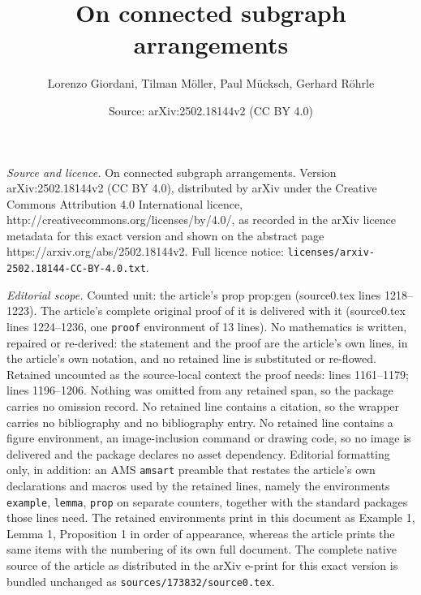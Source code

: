 \documentclass[10pt,a4paper]{amsart}
\title{On connected subgraph arrangements}
\author{Lorenzo Giordani, Tilman M\"oller, Paul M\"ucksch, Gerhard R\"ohrle}
\date{Source: arXiv:2502.18144v2 (CC BY 4.0)}
\begin{document}
\maketitle

\noindent\emph{Source and licence.} On connected subgraph arrangements. Version arXiv:2502.18144v2 (CC BY 4.0), distributed by arXiv under the Creative Commons Attribution 4.0 International licence, http://creativecommons.org/licenses/by/4.0/, as recorded in the arXiv licence metadata for this exact version and shown on the abstract page https://arxiv.org/abs/2502.18144v2. Full licence notice: \texttt{licenses/arxiv-2502.18144-CC-BY-4.0.txt}.\par\smallskip

\noindent\textit{Editorial scope.} Counted unit: the article's prop prop:gen (source0.tex lines 1218--1223). The article's complete original proof of it is delivered with it (source0.tex lines 1224--1236, one \texttt{proof} environment of 13 lines). No mathematics is written, repaired or re-derived: the statement and the proof are the article's own lines, in the article's own notation, and no retained line is substituted or re-flowed.  Retained uncounted as the source-local context the proof needs: lines 1161--1179; lines 1196--1206.  Nothing was omitted from any retained span, so the package carries no omission record.  No retained line contains a citation, so the wrapper carries no bibliography and no bibliography entry.  No retained line contains a figure environment, an image-inclusion command or drawing code, so no image is delivered and the package declares no asset dependency.  Editorial formatting only, in addition: an AMS \texttt{amsart} preamble that restates the article's own declarations and macros used by the retained lines, namely the environments \texttt{example}, \texttt{lemma}, \texttt{prop} on separate counters, together with the standard packages those lines need.  The retained environments print in this document as Example 1, Lemma 1, Proposition 1 in order of appearance, whereas the article prints the same items with the numbering of its own full document.  The complete native source of the article as distributed in the arXiv e-print for this exact version is bundled unchanged as \texttt{sources/173832/source0.tex}.
\end{document}
